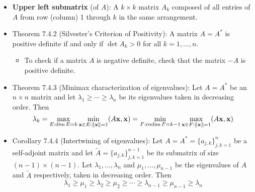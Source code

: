 \documentclass[../../notes.tex]{subfiles}
\begin{document}
\begin{itemize}
\begin{enumerate}
    \end{enumerate}
    \item \textbf{Upper left submatrix} (of $A$): A $k\times k$ matrix $A_k$ composed of all entries of $A$ from row (column) 1 through $k$ in the same arrangement.
    \item Theorem 7.4.2 (Silvester's Criterion of Positivity): A matrix $A=A^*$ is positive definite if and only if $\det A_k>0$ for all $k=1,\dots,n$.
    \begin{itemize}
        \item To check if a matrix $A$ is negative definite, check that the matrix $-A$ is positive definite.
    \end{itemize}
    \item Theorem 7.4.3 (Minimax characterization of eigenvalues): Let $A=A^*$ be an $n\times n$ matrix and let $\lambda_1\geq\cdots\geq\lambda_n$ be its eigenvalues taken in decreasing order. Then
    \begin{equation*}
        \lambda_k = \max_{E:\dim E=k}\min_{\mathbf{x}\in E:\norm{\mathbf{x}}=1}(A\mathbf{x},\mathbf{x})
        = \min_{F:\operatorname{codim} F=k-1}\max_{\mathbf{x}\in F:\norm{\mathbf{x}}=1}(A\mathbf{x},\mathbf{x})
    \end{equation*}
    \item Corollary 7.4.4 (Intertwining of eigenvalues): Let $A=A^*=\{a_{j,k}\}_{j,k=1}^n$ be a self-adjoint matrix and let $\tilde{A}=\{a_{j,k}\}_{j,k=1}^{n-1}$ be its submatrix of size $(n-1)\times(n-1)$. Let $\lambda_1,\dots,\lambda_n$ and $\mu_1,\dots,\mu_{n-1}$ be the eigenvalues of $A$ and $\tilde{A}$ respectively, taken in decreasing order. Then
    \begin{equation*}
        \lambda_1 \geq \mu_1 \geq \lambda_2 \geq \mu_2 \geq \cdots \geq \lambda_{n-1} \geq \mu_{n-1} \geq \lambda_n
    \end{equation*}
\end{itemize}
\end{document}

